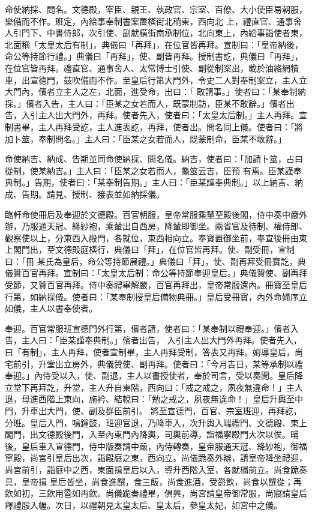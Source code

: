 \begin{pinyinscope}
 命使納採、問名。文德殿，宰臣、親王、執政官、宗室、百僚、大小使臣易朝服，樂備而不作。班定，內給事奉制書案置橫街北稍東，西向北
 上，禮直官、通事舍人引門下、中書侍郎，次引使、副就橫街南承制位，北向東上，內給事詣使者東，北面稱「太皇太后有制」，典儀曰「再拜」，在位官皆再拜。宣制曰：「皇帝納後，命公等持節行禮。」典儀曰「再拜」，使、副皆再拜。授制書訖，典儀曰「再拜」，在位官皆再拜。禮直官、通事舍人、太常博士引使、副從制案出，載於油絡網犢車，出宣德門，鼓吹備而不作。至皇后行第大門外，令史二人對奉制案立，主人立大門內，儐者立主人之左，北面，進受命，出曰：「
 敢請事。」使者曰：「某奉制納採。」儐者入告，主人曰：「臣某之女若而人，既蒙制訪，臣某不敢辭。」儐者出告，入引主人出大門外，再拜。使者先入，使者曰：「太皇太后制。」主人再拜。宣制書畢，主人再拜受訖，主人進表訖，再拜，使者出。問名同上儀。使者曰：「將加卜筮，奉制問名。」主人曰：「臣某之女若而人，既蒙制命，臣某不敢辭。」



 命使納吉、納成、告期並同命使納採、問名儀。納吉，使者曰：「加請卜筮，占曰從制，使某納吉。」主人曰：「臣某之女若而人，龜筮云吉，臣預
 有焉。臣某謹奉典制。」告期，使者曰：「某奉制告期。」主人曰：「臣某謹奉典制。」以上納吉、納成、告期。請見、授制、接表並如納採儀。



 臨軒命使冊后及奉迎於文德殿。百官朝服，皇帝常服乘輦至殿後閣，侍中奏中嚴外辦，乃服通天冠、絳紗袍，乘輦出自西房，降輦即御坐。兩省官及待制、權侍郎、觀察使以上，分東西入殿門，各就位，東西相向立。奉寶置御坐前，奉宣後冊由東上閣門出，至文德殿庭橫行，典儀曰「拜」，在位官皆再拜。使、副受冊，宣制曰：「冊
 某氏為皇后，命公等持節展禮。」典儀曰「拜」，使、副再拜受冊寶訖，典儀贊百官再拜。宣制曰：「太皇太后制：命公等持節奉迎皇后。」典儀贊使、副再拜受節，又贊百官再拜。侍中奏禮畢解嚴，百官再拜出，皇帝常服還內。冊寶至皇后行第，如納採儀。使者曰：「某奉制授皇后備物典冊。」皇后受冊寶，內外命婦序立如儀，主人以書奉使者。



 奉迎。百官常服班宣德門外行第，儐者請，使者曰：「某奉制以禮奉迎。」儐者入告，主人曰：「臣某謹奉典制。」儐者出告，
 入引主人出大門外再拜。使者先入，曰「有制」，主人再拜，使者宣制畢，主人再拜受制，答表又再拜。姆導皇后，尚宅前引，升堂出立房外，典儀贊使、副再拜。使者曰：「今月吉日，某等承制以禮奉迎。」內侍受以入，使、副退，主人以書授使者，奉於司言，受以奏聞。皇后降立堂下再拜訖，升堂，主人升自東階，西向曰：「戒之戒之，夙夜無違命！」主人退，母進西階上東向，施衿、結帨曰：「勉之戒之，夙夜無違命！」皇后升輿至中門，升車出大門，使、副及群臣前引。
 將至宣德門，百官、宗室班迎，再拜訖，分班。皇后入門，鳴鐘鼓，班迎官退，乃降車入，次升輿入端禮門、文德殿、東上閣門，出文德殿後門，入至內東門內降輿，司輿前導，詣福寧殿門大次以俟。晡後，皇后車入宣德門，侍中版奏請中嚴，內侍轉奏，皇帝服通天冠、絳紗袍，御福寧殿，尚宮引皇后出次，詣殿庭之東，西向立。尚儀跪奏外辦，請皇帝降坐禮迎，尚宮前引，詣庭中之西，東面揖皇后以入，導升西階入室，各就榻前立。尚食跪奏具，皇帝揖
 皇后皆坐，尚食進饌，食三飯，尚食進酒，受爵飲，尚食以饌從；再飲如初，三飲用巹如再飲。尚儀跪奏禮畢，俱興，尚宮請皇帝御常服，尚寢請皇后釋禮服入幄。次日，以禮朝見太皇太后、皇太后，參皇太妃，如宮中之儀。




\end{pinyinscope}
